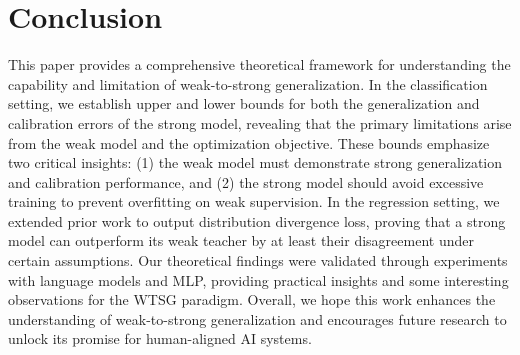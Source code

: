 \section{Conclusion}

This paper provides a comprehensive theoretical framework for understanding the capability and limitation of weak-to-strong generalization. 
In the classification setting, we establish upper and lower bounds for both the generalization and calibration errors of the strong model, revealing that the primary limitations arise from the weak model and the optimization objective. 
These bounds emphasize two critical insights: (1) the weak model must demonstrate strong generalization and calibration performance, and (2) the strong model should avoid excessive training to prevent overfitting on weak supervision.
In the regression setting, we extended prior work to output distribution divergence loss, proving that a strong model can outperform its weak teacher by at least their disagreement under certain assumptions. 
Our theoretical findings were validated through experiments with language models and MLP, providing practical insights and some interesting observations for the WTSG paradigm.
Overall, we hope this work enhances the understanding of weak-to-strong generalization and encourages future research to unlock its promise for human-aligned AI systems.











